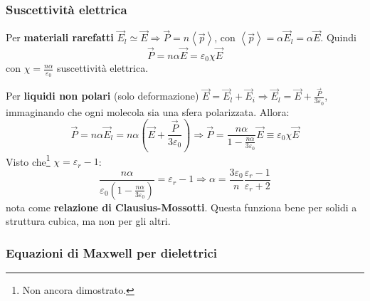 \documentclass[10pt, a4paper]{scrartcl}
\numberwithin{equation}{subsection}
\theoremstyle{style1}
\begin{document}
\subsubsection{Suscettivit\`a elettrica}

Per \textbf{materiali rarefatti} $\vec{E}_l \simeq \vec{E}\Rightarrow \vec{P} = n \left\langle \vec{p} \right\rangle$, con $\left\langle \vec{p} \right\rangle= \alpha \vec{E}_l = \alpha \vec{E}$. Quindi
\begin{equation}
	\vec{P} =  n \alpha  \vec{E} = \varepsilon _0 \chi  \vec{E}
\end{equation}
con $\chi = \frac{n\alpha }{\varepsilon _0}$ suscettivit\`a elettrica.

Per \textbf{liquidi non polari} (solo deformazione) $\vec{E} = \vec{E}_l + \vec{E}_i\Rightarrow \vec{E}_l = \vec{E} + \frac{\vec{P}}{3\varepsilon _0}$, immaginando che ogni molecola sia una sfera polarizzata. Allora:
\begin{equation}
	\vec{P} = n\alpha \vec{E}_l = n \alpha  \left(\vec{E}+ \frac{\vec{P}}{3\varepsilon _0}\right) \Rightarrow \vec{P}= \frac{n\alpha }{1-\frac{n\alpha }{3\varepsilon _0}}\vec{E} \equiv \varepsilon _0 \chi \vec{E}
\end{equation}
Visto che\footnote{Non ancora dimostrato.} $\chi = \varepsilon _r -1$:
\begin{equation}
	\frac{n\alpha }{\varepsilon _0 \left(1- \frac{n\alpha }{3\varepsilon _0}\right) } = \varepsilon _r - 1 \Rightarrow \alpha = \frac{3\varepsilon _0}{n}\frac{\varepsilon _r-1}{\varepsilon _r+2}
\end{equation}
nota come \textbf{relazione di Clausius-Mossotti}. Questa funziona bene per solidi a struttura cubica, ma non per gli altri.
\subsubsection{Equazioni di Maxwell per dielettrici}
\end{document}
